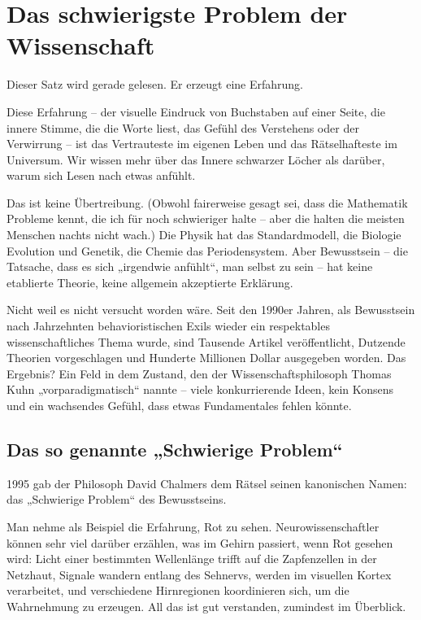 \documentclass[11pt, twoside, openright]{book}
\begin{document}
\chapter{Das schwierigste Problem der Wissenschaft}

Dieser Satz wird gerade gelesen. Er erzeugt eine Erfahrung.

Diese Erfahrung -- der visuelle Eindruck von Buchstaben auf einer Seite, die innere Stimme, die die Worte liest, das Gefühl des Verstehens oder der Verwirrung -- ist das Vertrauteste im eigenen Leben und das Rätselhafteste im Universum. Wir wissen mehr über das Innere schwarzer Löcher als darüber, warum sich Lesen nach etwas anfühlt.

Das ist keine Übertreibung. (Obwohl fairerweise gesagt sei, dass die Mathematik Probleme kennt, die ich für noch schwieriger halte -- aber die halten die meisten Menschen nachts nicht wach.) Die Physik hat das Standardmodell, die Biologie Evolution und Genetik, die Chemie das Periodensystem. Aber Bewusstsein -- die Tatsache, dass es sich „irgendwie anfühlt“, man selbst zu sein -- hat keine etablierte Theorie, keine allgemein akzeptierte Erklärung.

Nicht weil es nicht versucht worden wäre. Seit den 1990er Jahren, als Bewusstsein nach Jahrzehnten behavioristischen Exils wieder ein respektables wissenschaftliches Thema wurde, sind Tausende Artikel veröffentlicht, Dutzende Theorien vorgeschlagen und Hunderte Millionen Dollar ausgegeben worden. Das Ergebnis? Ein Feld in dem Zustand, den der Wissenschaftsphilosoph Thomas Kuhn „vorparadigmatisch“ nannte -- viele konkurrierende Ideen, kein Konsens und ein wachsendes Gefühl, dass etwas Fundamentales fehlen könnte.

\section*{Das so genannte „Schwierige Problem“}

1995 gab der Philosoph David Chalmers dem Rätsel seinen kanonischen Namen: das „Schwierige Problem“ des Bewusstseins.

Man nehme als Beispiel die Erfahrung, Rot zu sehen. Neurowissenschaftler können sehr viel darüber erzählen, was im Gehirn passiert, wenn Rot gesehen wird: Licht einer bestimmten Wellenlänge trifft auf die Zapfenzellen in der Netzhaut, Signale wandern entlang des Sehnervs, werden im visuellen Kortex verarbeitet, und verschiedene Hirnregionen koordinieren sich, um die Wahrnehmung zu erzeugen. All das ist gut verstanden, zumindest im Überblick.
\end{document}
